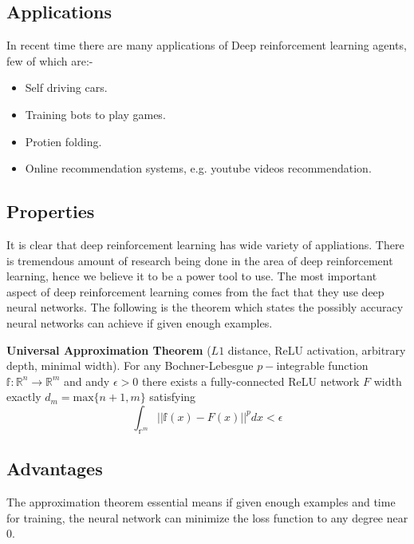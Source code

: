 \subsection{Applications}
In recent time there are many applications of Deep reinforcement learning agents, few of which are:-
\begin{itemize}
    \item Self driving cars.
    \item Training bots to play games.
    \item Protien folding.
    \item Online recommendation systems, e.g. youtube videos recommendation.
\end{itemize}
\subsection{Properties}
It is clear that deep reinforcement learning has wide variety of appliations. There is tremendous amount of research being done in the area of deep reinforcement learning, hence we believe it to be a power tool to use. The most important aspect of deep reinforcement learning comes from the fact that they use deep neural networks. The following is the theorem which states the possibly accuracy neural networks can achieve if given enough examples.

\par \textbf{Universal Approximation Theorem} ($L1$ distance, ReLU activation, arbitrary depth, minimal width). For any Bochner-Lebesgue $p-$integrable function $\mathbb{f}:\mathbb{R}^{n}\rightarrow\mathbb{R}^{m}$ and andy $\epsilon>0$ there exists a fully-connected ReLU network $F$ width exactly $d_{m}=\text{max}\{n+1,m\}$ satisfying 
$$\int_{\mathbb{r}^{m}}||\mathbb{f}(x)-F(x)||^{p}dx<\epsilon$$


\subsection{Advantages}
The approximation theorem essential means if given enough examples and time for training, the neural network can minimize the loss function to any degree near $0$. 



